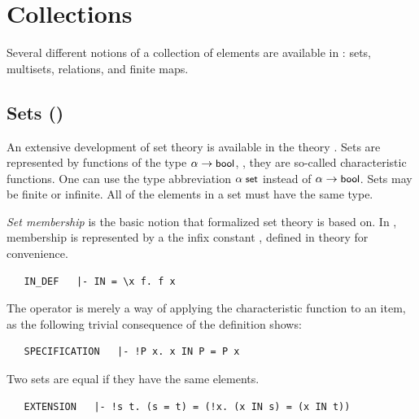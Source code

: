 {

\section{Collections}

Several different notions of a collection of elements are available in
\HOL: sets, multisets, relations, and finite maps.

\subsection{Sets ()}
\label{sec:theory-of-sets}

An extensive development of set theory is available in the theory
. Sets are represented by functions of the type
$\alpha \to \mbox{\small{\textbf{\sf{bool}}}}$, \ie, they are so-called characteristic
functions.
%
%
One can use the type abbreviation $\alpha\; \mbox{\small{\textbf{\sf{set}}}}$
instead of $\alpha \to \mbox{\small{\textbf{\sf{bool}}}}$. Sets may be finite or
infinite. All of the elements in a set must have the same type.

\emph{Set membership} is the basic notion that formalized set theory
is based on. In \HOL, membership is represented by a the infix
constant , defined in theory  for
convenience.
\begin{hol}
\begin{verbatim}
   IN_DEF   |- IN = \x f. f x
\end{verbatim}
\end{hol}
The  operator is merely a way of applying the
characteristic function to an item, as the following trivial
consequence of the definition shows:
\begin{hol}
\begin{verbatim}
   SPECIFICATION   |- !P x. x IN P = P x
\end{verbatim}
\end{hol}
Two sets are equal if they have the same elements.
\begin{hol}
\begin{verbatim}
   EXTENSION   |- !s t. (s = t) = (!x. (x IN s) = (x IN t))
\end{verbatim}
\end{hol}

}
